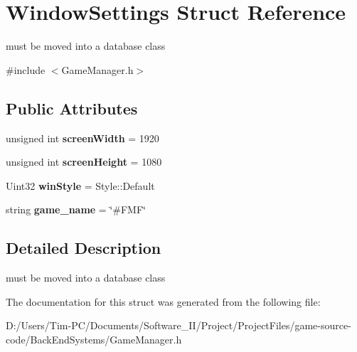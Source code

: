 \hypertarget{struct_window_settings}{}\section{Window\+Settings Struct Reference}
\label{struct_window_settings}


must be moved into a database class  




{\ttfamily \#include $<$Game\+Manager.\+h$>$}

\subsection*{Public Attributes}
\begin{DoxyCompactItemize}
\item 
\mbox{\label{struct_window_settings_a92700db968541f97969b92c619387632}} 
unsigned int {\bfseries screen\+Width} = 1920
\item 
\mbox{\label{struct_window_settings_a7a55e4202ec4cf5a902705378aaeba05}} 
unsigned int {\bfseries screen\+Height} = 1080
\item 
\mbox{\label{struct_window_settings_a516e48e18e091b958e2641691441f19c}} 
Uint32 {\bfseries win\+Style} = Style\+::\+Default
\item 
\mbox{\label{struct_window_settings_a1f2d036a0d0946ec355dc3a5e099746c}} 
string {\bfseries game\+\_\+name} = \char`\"{}\#F\+MF\char`\"{}
\end{DoxyCompactItemize}


\subsection{Detailed Description}
must be moved into a database class 

The documentation for this struct was generated from the following file\+:\begin{DoxyCompactItemize}
\item 
D\+:/\+Users/\+Tim-\/\+P\+C/\+Documents/\+Software\+\_\+\+I\+I/\+Project/\+Project\+Files/game-\/source-\/code/\+Back\+End\+Systems/Game\+Manager.\+h\end{DoxyCompactItemize}
